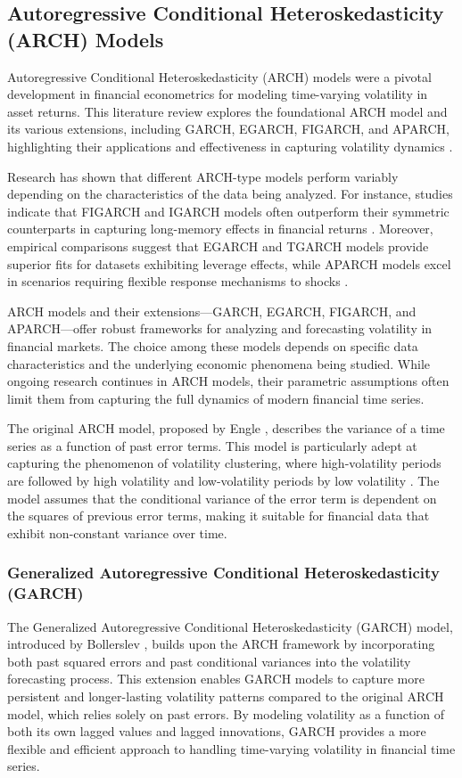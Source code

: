 \documentclass[8pt]{article}
\begin{document}
\begin{multicols}{2}
		\subsection{Autoregressive Conditional Heteroskedasticity (ARCH) Models}
		Autoregressive Conditional Heteroskedasticity (ARCH) models were a pivotal development in financial econometrics for modeling time-varying volatility in asset returns. This literature review explores the foundational ARCH model and its various extensions, including GARCH, EGARCH, FIGARCH, and APARCH, highlighting their applications and effectiveness in capturing volatility dynamics \cite{bollerslev2010}.
		
		Research has shown that different ARCH-type models perform variably depending on the characteristics of the data being analyzed. For instance, studies indicate that FIGARCH and IGARCH models often outperform their symmetric counterparts in capturing long-memory effects in financial returns \cite{degiannakis2005, rodriguez2017}. Moreover, empirical comparisons suggest that EGARCH and TGARCH models provide superior fits for datasets exhibiting leverage effects, while APARCH models excel in scenarios requiring flexible response mechanisms to shocks \cite{ruzgar2007, szymoniak2020}.
		
		ARCH models and their extensions—GARCH, EGARCH, FIGARCH, and APARCH—offer robust frameworks for analyzing and forecasting volatility in financial markets. The choice among these models depends on specific data characteristics and the underlying economic phenomena being studied. While ongoing research continues in ARCH models, their parametric assumptions often limit them from capturing the full dynamics of modern financial time series.
		
		The original ARCH model, proposed by Engle \cite{engle1982}, describes the variance of a time series as a function of past error terms. This model is particularly adept at capturing the phenomenon of volatility clustering, where high-volatility periods are followed by high volatility and low-volatility periods by low volatility \cite{brooks2014}. The model assumes that the conditional variance of the error term is dependent on the squares of previous error terms, making it suitable for financial data that exhibit non-constant variance over time.
		
\subsubsection{Generalized Autoregressive Conditional Heteroskedasticity (GARCH)}
The Generalized Autoregressive Conditional Heteroskedasticity (GARCH) model, introduced by Bollerslev \cite{bollerslev1986}, builds upon the ARCH framework by incorporating both past squared errors and past conditional variances into the volatility forecasting process. This extension enables GARCH models to capture more persistent and longer-lasting volatility patterns compared to the original ARCH model, which relies solely on past errors. By modeling volatility as a function of both its own lagged values and lagged innovations, GARCH provides a more flexible and efficient approach to handling time-varying volatility in financial time series.


\end{multicols}
\end{document}
